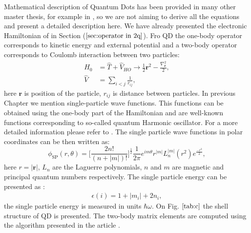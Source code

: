 \documentclass[twoside,english]{uiofysmaster}
\theoremstyle{definition}
\begin{document}
Mathematical description of Quantum Dots has been provided in many other master thesis, for example in \cite{lohneCOUPLEDCLUSTERSTUDIESQUANTUM}, so we are not aiming to derive all the equations and present a detailed description here. We have already presented the electronic Hamiltonian of in Section ($\ref{sec:operator in 2q}$). Fro QD the one-body operator corresponds to kinetic energy and external potential and a two-body operator corresponds to Coulomb interaction between two particles:
\begin{align}
\hat{H}_0&= \hat{T}+\hat{V}_{HO} \rightarrow \frac{1}{2} \textbf{r}^2-\frac{\nabla_\textbf{r}^2}{2} ,\\
\hat{V}&= \sum_{i<j}\frac{1}{r_{ij}},
\end{align}
here $\textbf{r}$ is position of the particle, $r_{ij}$ is distance between particles.
In previous Chapter we mention single-particle wave functions. This functions can be obtained using the one-body part of the Hamiltonian and are well-known functions corresponding to so-called quantum Harmonic oscillator. For a more detailed information please refer to \cite{sakuraiModernQuantumMechanics1993}. The single particle wave functions in polar coordinates can be then written as:
\begin{equation}
\phi_\text{SP}(r,\theta)= \bigg[ \frac{2n!}{(n+|m|)!} \bigg]^{\frac{1}{2}} \frac{1}{2\pi} e^{im\theta}r^{|m|}L_n^{|m|}(r^2)e^{\frac{-r^2}{2}},
\end{equation}
here $r=|\textbf{r}|$, $L_n$ are the Laguerre polynomials, $n$ and $m$ are magnetic and principal quantum numbers respectively.
The single particle energy can be presented as :
\begin{eqnarray}
\epsilon(i)= 1+|m_i|+ 2n_i,
\end{eqnarray}
the single particle energy is measured in units $\hbar\omega$. On Fig. $\ref{tab:c}$ the shell structure of QD is presented.
The two-body matrix elements are computed using the algorithm presented in the article \cite{EnergySpectraFewelectron}.
\end{document}
